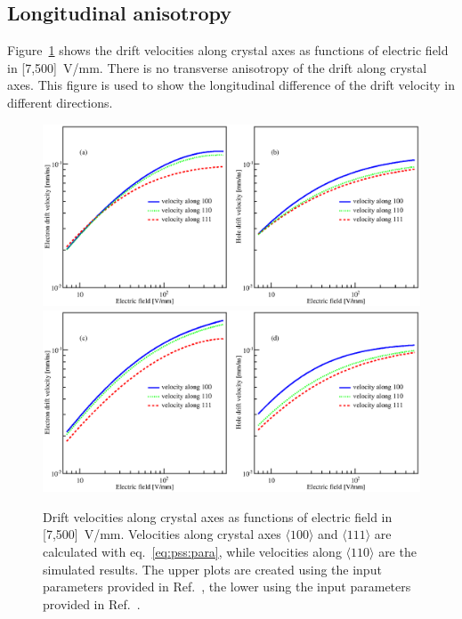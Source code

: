 
\subsection{Longitudinal anisotropy}
\label{sec:psa:long}
Figure~\ref{fig:psa:vvse} shows the drift velocities along crystal axes as functions of electric field in [7,500]~V/mm. There is no transverse anisotropy of the drift along crystal axes. This figure is used to show the longitudinal difference of the drift velocity in different directions. 
\begin{figure}[tbhp]
  \centering
  \includegraphics[width=\textwidth]{VvsElucian} \\\hfil
  \includegraphics[width=\textwidth]{VvsEbart}
  \caption{Drift velocities along crystal axes as functions of electric field in [7,500]~V/mm. Velocities along crystal axes $\langle 100 \rangle$ and $\langle 111 \rangle$ are calculated with eq.~\ref{eq:pss:para}, while velocities along $\langle 110 \rangle$ are the simulated results. The upper plots are created using the input parameters provided in Ref.~\cite{miha}, the lower using the input parameters provided in Ref.~\cite{bart}.}
  \label{fig:psa:vvse}
\end{figure}

